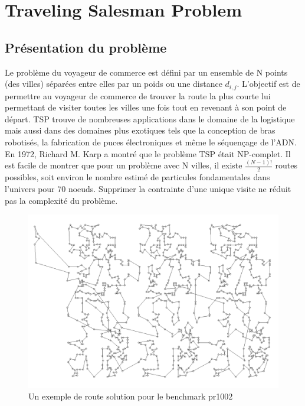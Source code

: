 \documentclass{article}%
\begin{document}
\clearpage


\section{Traveling Salesman Problem}

\subsection{Présentation du problème}

Le problème du voyageur de commerce est défini par un ensemble de N points (des villes) séparées entre elles par un poids ou une distance $ d_{i,j} $.
L'objectif est de permettre au voyageur de commerce de trouver la route la plus courte lui permettant de visiter toutes les villes une fois tout en revenant à son point de départ. TSP trouve de nombreuses applications dans le domaine de la logistique mais aussi dans des domaines plus exotiques tels que la conception de bras robotisés, la fabrication de puces électroniques et même le séquençage de l'ADN.
	En 1972, Richard M. Karp a montré que le problème TSP était NP-complet. Il est facile de montrer que pour un problème avec N villes, il existe $ \frac{(N-1)!}{2} $ routes possibles, soit environ le nombre estimé de particules fondamentales dans l'univers pour 70 noeuds. Supprimer la contrainte d'une unique visite ne réduit pas la complexité du problème. 

\begin{figure}[h]
\begin{center}
\includegraphics[scale=0.4]{pr1002.png} 
\caption{Un exemple de route solution pour le benchmark pr1002}
\end{center}
\end{figure}
\end{document}
